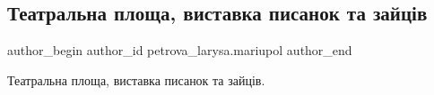  
 
 
 
 

\subsection{Театральна площа, виставка писанок та  зайців}
\label{sec:27_04_2019.fb.petrova_larysa.mariupol.2.teatralna_ploscha_vystavka_pysanok_ta_zajciv}

\ifcmt
 author_begin
   author_id petrova_larysa.mariupol
 author_end
\fi

Театральна площа, виставка писанок та  зайців.
